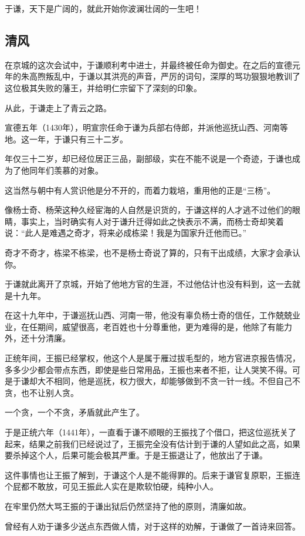\begin{multicols}{\theparacolNo}
于谦，天下是广阔的，就此开始你波澜壮阔的一生吧！

\subsection{清风}
在京城的这次会试中，于谦顺利考中进士，并最终被任命为御史。在之后的宣德元年的朱高煦叛乱中，于谦以其洪亮的声音，严厉的词句，深厚的骂功狠狠地教训了这位极其失败的藩王，并给明仁宗留下了深刻的印象。

从此，于谦走上了青云之路。

宣德五年（1430年），明宣宗任命于谦为兵部右侍郎，并派他巡抚山西、河南等地。这一年，于谦只有三十二岁。

年仅三十二岁，却已经位居正三品，副部级，实在不能不说是一个奇迹，于谦也成为了他同年们羡慕的对象。

这当然与朝中有人赏识他是分不开的，而着力栽培，重用他的正是“三杨”。

像杨士奇、杨荣这种久经宦海的人自然是识货的，于谦这样的人才逃不过他们的眼睛，事实上，当时确实有人对于谦升迁得如此之快表示不满，而杨士奇却笑着说：“此人是难遇之奇才，将来必成栋梁！我是为国家升迁他而已。”

奇才不奇才，栋梁不栋梁，也不是杨士奇说了算的，只有干出成绩，大家才会承认你。

于谦就此离开了京城，开始了他地方官的生涯，不过他估计也没有料到，这一去就是十九年。

在这十九年中，于谦巡抚山西、河南一带，他没有辜负杨士奇的信任，工作兢兢业业，在任期间，威望很高，老百姓也十分尊重他，更为难得的是，他除了有能力外，还十分清廉。

正统年间，王振已经掌权，他这个人是属于雁过拔毛型的，地方官进京报告情况，多多少少都会带点东西，即使是些日常用品，王振也来者不拒，让人哭笑不得。可是于谦却大不相同，他是巡抚，权力很大，却能够做到不贪一针一线。不但自己不贪，也不让别人贪。

一个贪，一个不贪，矛盾就此产生了。

于是正统六年（1441年），一直看于谦不顺眼的王振找了个借口，把这位巡抚关了起来，结果之前我们已经说过了，王振完全没有估计到于谦的人望如此之高，如果要杀掉这个人，后果可能会极其严重。于是王振退让了，他放出了于谦。

这件事情也让王振了解到，于谦这个人是不能得罪的。后来于谦官复原职，王振连个屁都不敢放，可见王振此人实在是欺软怕硬，纯种小人。

在牢里仍然大骂王振的于谦出狱后仍然坚持了他的原则，清廉如故。

曾经有人劝于谦多少送点东西做人情，对于这样的劝解，于谦做了一首诗来回答。


\end{multicols}
